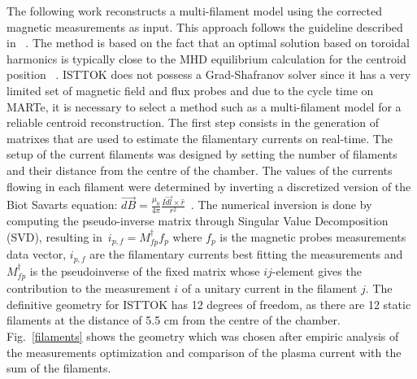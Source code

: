 The following work reconstructs a multi-filament model using the corrected magnetic measurements as input. This approach follows the guideline described in ~\cite[Chapter~3]{PirontiBook}. The method is based on the fact that an optimal solution based on toroidal harmonics is typically close to the MHD equilibrium calculation for the centroid position ~\cite[Chapter~3]{PirontiBook}. ISTTOK does not possess a Grad-Shafranov solver since it  has a very limited set of magnetic field and flux probes and due to the cycle time on MARTe, it is necessary to select a method such as a multi-filament model for a reliable centroid reconstruction.  The first step consists in the generation of  matrixes that are used to estimate the filamentary currents on real-time. The setup of the current filaments was designed by setting the number of filaments and their distance from the centre of the chamber. The values of the currents flowing in each filament were determined by inverting a discretized version of the Biot Savart\textquotesingle s equation: $ \Vec{dB}=\frac{\mu_0}{4\pi}\frac{I\Vec{dl}\times \hat{r}}{r^2} \,$ . The numerical inversion is done by computing the pseudo-inverse matrix through Singular Value Decomposition (SVD), resulting in  $\, i_{p,f}=M^{\dagger}_{fp}f_p$ where $f_{p}$ is the  magnetic probes measurements data vector, $i_{p,f}$ are the  filamentary currents best fitting the measurements and $M^{\dagger}_{fp}$ is the pseudoinverse of the fixed matrix whose $ij$-element gives the contribution to the measurement  $i$ of a unitary current in the filament $j$. The definitive geometry for ISTTOK has 12 degrees of freedom, as there are 12 static filaments at the distance of 5.5 cm from the centre of the chamber. Fig.~\ref{filaments} shows the geometry  which was chosen  after  empiric  analysis  of  the  measurements  optimization  and comparison  of  the  plasma  current  with  the  sum  of  the  filaments.




